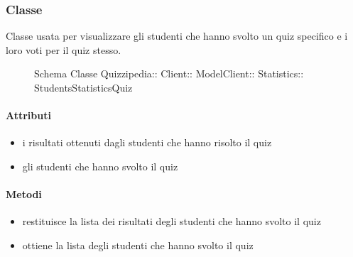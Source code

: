 \subsubsection{Classe }
Classe usata per visualizzare gli studenti che hanno svolto un quiz specifico e i loro voti per il quiz stesso.
\begin{figure}[H]
\centering
\noindent{}
\caption[Schema Classe StudentsStatisticsQuiz]{Schema Classe Quizzipedia:: Client:: ModelClient:: Statistics:: StudentsStatisticsQuiz}
\end{figure}
\paragraph{Attributi}
\begin{itemize}
\item {}
\newline
i risultati ottenuti dagli studenti che hanno risolto il quiz
\item {}
\newline
gli studenti che hanno svolto il quiz
\end{itemize}
\paragraph{Metodi}
\begin{itemize}
\item {}
\newline
restituisce la lista dei risultati degli studenti che hanno svolto il quiz
\newline
\item {}
\newline
ottiene la lista degli studenti che hanno svolto il quiz
\newline
\end{itemize}
